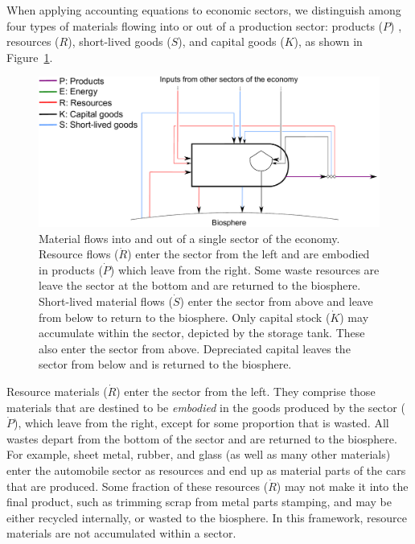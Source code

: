 When applying accounting equations to economic sectors,
we distinguish among four types of
materials flowing into or out of a production sector: 
products ($P$) , 
resources ($R$),
short-lived goods ($S$),
and capital goods ($K$), 
as shown in Figure~\ref{fig:PERKS_materials}.

\begin{figure}[!ht]
\centering{}
\includegraphics[width=0.8\linewidth]{Part_1/Chapter_Materials/images/PERKS_basic_unit_materials.pdf}
\caption[Material flows into and out of a single sector 
of the economy]{Material flows into and out of 
a single sector of the economy. 
Resource flows ($\dot{R}$) enter the sector from the left 
and are embodied in products ($\dot{P}$) which leave from the right. 
Some waste resources are leave the sector at the 
bottom and are returned to the biosphere.
Short-lived material flows ($\dot{S}$) 
enter the sector from above and leave from below to return to the biosphere. 
Only capital stock ($\dot{K}$) may accumulate within the sector,
depicted by the storage tank.
These also enter the sector from above. 
Depreciated capital leaves the sector from below and is returned to the biosphere.}
\label{fig:PERKS_materials}
\end{figure}

Resource materials ($\dot{R}$) 
enter the sector from the left.
They comprise those materials that are destined to be \emph{embodied} 
in the goods produced by the sector ($\dot{P}$), which leave from the right,
except for some proportion that is wasted.
All wastes depart from the bottom of the sector and are
returned to the biosphere. 
For example, sheet metal, rubber, and glass
(as well as many other materials) 
enter the automobile sector as resources 
and end up as material parts of the cars that are produced. 
Some fraction of these resources ($\dot{R}$) may not make it into the final product, 
such as trimming scrap from metal parts stamping, 
and may be either recycled internally, 
or wasted to the biosphere. 
In this framework, 
resource materials are not accumulated within a sector.

